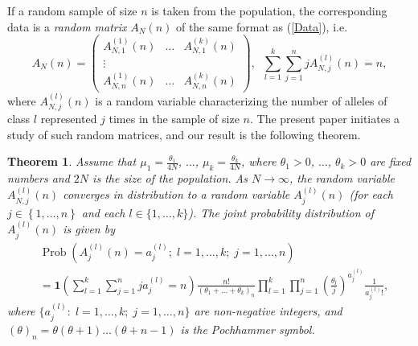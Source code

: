 \documentclass[12pt]{amsart}
\newtheorem{thm}{Theorem}[section]
\theoremstyle{definition}
\numberwithin{equation}{section}
\DeclareMathOperator{\Prob}{Prob}
\begin{document}
If a random sample of size $n$
is taken from the population, the corresponding data is a \textit{random matrix}
$A_N(n)$ of the same format as (\ref{Data}), i.e.
$$
A_N(n)=
\left(
\begin{array}{ccc}
  A_{N,1}^{(1)}(n) & \ldots & A_{N,1}^{(k)}(n) \\
  \vdots &  &  \\
  A_{N,n}^{(1)}(n) & \ldots & A_{N,n}^{(k)}(n)
\end{array}
\right),\;\;\sum\limits_{l=1}^k\sum\limits_{j=1}^njA_{N,j}^{(l)}(n)=n,
$$
where $A_{N,j}^{(l)}(n)$ is a random variable characterizing the number of alleles of class $l$ represented $j$ times in the sample of size $n$.
The present paper initiates a study of such random matrices, and our result
is the following theorem.
\begin{thm}\label{MAINTHEOREM}
Assume that $\mu_1=\frac{\theta_1}{4N}$, $\ldots$, $\mu_k=\frac{\theta_k}{4N}$, where $\theta_1>0$, $\ldots$, $\theta_k>0$ are fixed numbers
and $2N$ is the size of the population.
As $N\longrightarrow\infty$, the random variable $A_{N,j}^{(l)}(n)$ converges
in distribution to a random variable $A_{j}^{(l)}(n)$ (for each $j\in\left\{1,\ldots,n\right\}$ and each $l\in\{1,\ldots,k\}$). The joint probability distribution
of $A_j^{(l)}(n)$ is given by
\begin{equation}\label{RefinedESF}
\begin{split}
&\Prob\left(A_j^{(l)}(n)=a_j^{(l)};\; l=1,\ldots,k;\;j=1,\ldots,n\right)\\
&=
\mathbf{1}\left(\sum\limits_{l=1}^k\sum\limits_{j=1}^nja_j^{(l)}=n\right)
\frac{n!}{\left(\theta_1+\ldots+\theta_k\right)_n}\prod\limits_{l=1}^k\prod\limits_{j=1}^n
\left(\frac{\theta_l}{j}\right)^{a_j^{(l)}}\frac{1}{a_j^{(l)}!},
\end{split}
\end{equation}
where $\{a_j^{(l)}:\;l=1,\ldots,k;\; j=1,\ldots,n \}$ are non-negative integers, and $(\theta)_n=\theta (\theta+1)\ldots(\theta+n-1)$ is the Pochhammer symbol.
\end{thm}
\end{document}
